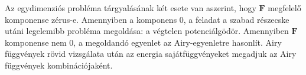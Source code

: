 Az egydimenziós probléma tárgyalásának két esete van aszerint, hogy $\boldsymbol{F}$ megfelelő komponense zérus-e. Amennyiben a komponens $0$, a feladat a szabad részecske utáni legelemibb probléma megoldása: a végtelen potenciálgödör. Amennyiben $\boldsymbol{F}$ komponense nem 0, a megoldandó egyenlet az Airy-egyenletre \cite{beals_wong_2010} hasonlít. Airy függvények rövid vizsgálata után az energia sajátfüggvényeket megadjuk az Airy függvények kombinációjaként.






